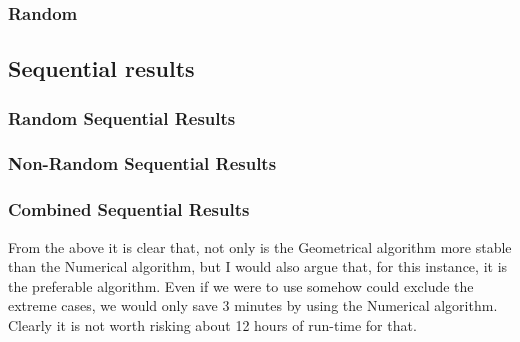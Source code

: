 
\subsubsection{Random}

\subsection{Sequential results}
\subsubsection{Random Sequential Results}


 


\subsubsection{Non-Random Sequential Results}


 


\subsubsection{Combined Sequential Results}


 


From the above it is clear that, not only is the Geometrical algorithm more stable than the Numerical algorithm, but I would also argue that, for this instance, it is the preferable algorithm. Even if we were to use somehow could exclude the extreme cases, we would only save 3 minutes by using the Numerical algorithm. Clearly it is not worth risking about 12 hours of run-time for that. 

